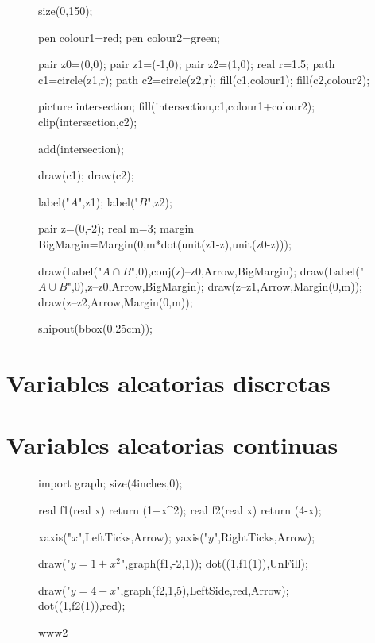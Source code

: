 \documentclass[a4paper]{report}
\begin{document}
												\begin{figure}[!ht]
													\centering
													\begin{asy}
														size(0,150);

														pen colour1=red;
														pen colour2=green;

														pair z0=(0,0);
														pair z1=(-1,0);
														pair z2=(1,0);
														real r=1.5;
														path c1=circle(z1,r);
														path c2=circle(z2,r);
														fill(c1,colour1);
														fill(c2,colour2);

														picture intersection;
														fill(intersection,c1,colour1+colour2);
														clip(intersection,c2);

														add(intersection);

														draw(c1);
														draw(c2);

														label("$A$",z1);
														label("$B$",z2);

														pair z=(0,-2);
														real m=3;
														margin BigMargin=Margin(0,m*dot(unit(z1-z),unit(z0-z)));

														draw(Label("$A\cap B$",0),conj(z)--z0,Arrow,BigMargin);
														draw(Label("$A\cup B$",0),z--z0,Arrow,BigMargin);
														draw(z--z1,Arrow,Margin(0,m));
														draw(z--z2,Arrow,Margin(0,m));

														shipout(bbox(0.25cm));

													\end{asy}
													\caption{}
												\end{figure}

												\chapter{Variables aleatorias discretas}

												\chapter{Variables aleatorias continuas}


												\begin{figure}[!ht]
													\centering
													\begin{asy}
														import graph;
														size(4inches,0);

														real f1(real x) {return (1+x^2);}
														real f2(real x) {return (4-x);}

														xaxis("$x$",LeftTicks,Arrow);
														yaxis("$y$",RightTicks,Arrow);

														draw("$y=1+x^2$",graph(f1,-2,1));
														dot((1,f1(1)),UnFill);

														draw("$y=4-x$",graph(f2,1,5),LeftSide,red,Arrow);
														dot((1,f2(1)),red);
													\end{asy}
													\caption{www2}
												\end{figure}
\end{document}
